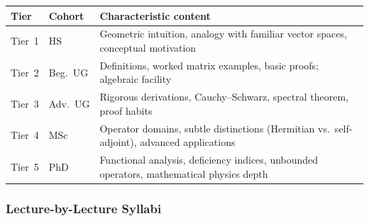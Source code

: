 \documentclass[11pt,a4paper]{article}
\begin{document}
\begin{center}
\begin{tabular}{llp{9cm}}
\toprule
\textbf{Tier} & \textbf{Cohort} & \textbf{Characteristic content}\\
\midrule
Tier~1 & HS       & Geometric intuition, analogy with familiar vector spaces, conceptual motivation\\
Tier~2 & Beg.\ UG & Definitions, worked matrix examples, basic proofs; algebraic facility\\
Tier~3 & Adv.\ UG & Rigorous derivations, Cauchy--Schwarz, spectral theorem, proof habits\\
Tier~4 & MSc      & Operator domains, subtle distinctions (Hermitian vs.\ self-adjoint), advanced applications\\
Tier~5 & PhD      & Functional analysis, deficiency indices, unbounded operators, mathematical physics depth\\
\bottomrule
\end{tabular}
\end{center}

\subsubsection*{Lecture-by-Lecture Syllabi}
\end{document}
